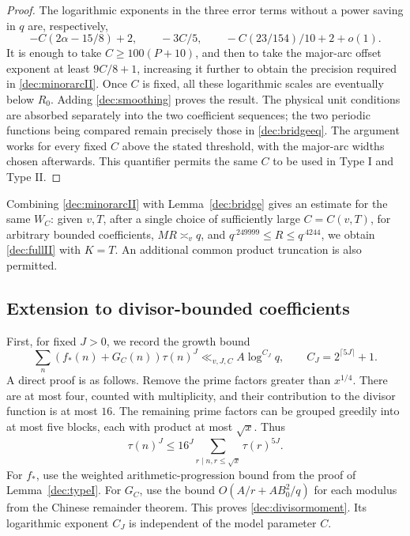 \documentclass[11pt,a4paper]{article}
\theoremstyle{paperplain}
\numberwithin{equation}{section}
\begin{document}
\begin{proof}
The logarithmic exponents in the three error terms without a power
saving in $q$ are, respectively,
\[
 -C(2\alpha-15/8)+2,\qquad -3C/5,\qquad
 -C(23/154)/10+2+o(1).
\]
It is enough to take $C\ge100(P+10)$, and then to take the
major-arc offset exponent at least $9C/8+1$, increasing it further
to obtain the precision required in \eqref{dec:minorarcII}.
Once $C$ is fixed, all these logarithmic scales are eventually below
$R_0$. Adding \eqref{dec:smoothing} proves the result.
The physical unit conditions are absorbed separately into the two
coefficient sequences; the two periodic functions being compared
remain precisely those in \eqref{dec:bridgeeq}.
The argument works for every fixed $C$ above the stated threshold,
with the major-arc widths chosen afterwards. This quantifier permits
the same $C$ to be used in Type I and Type II.
\end{proof}

Combining \eqref{dec:minorarcII} with Lemma~\ref{dec:bridge} gives
an estimate for the same $W_C$:
given $v,T$, after a single choice of sufficiently large $C=C(v,T)$,
for arbitrary bounded coefficients, $MR\asymp_vq$, and
$q^{.249999}\le R\le q^{.4244}$, we obtain \eqref{dec:fullII}
with $K=T$.
An additional common product truncation is also permitted.

\subsection{Extension to divisor-bounded coefficients}

First, for fixed $J>0$, we record the growth bound
\begin{equation}\label{dec:divisormoment}
 \sum_n(f_*(n)+G_C(n))\tau(n)^J
 \ll_{v,J,C}A\log^{C_J}q,\qquad C_J=2^{\lceil5J\rceil}+1.
\end{equation}
A direct proof is as follows.
Remove the prime factors greater than $x^{1/4}$.
There are at most four, counted with multiplicity, and their
contribution to the divisor function is at most $16$.
The remaining prime factors can be grouped greedily into at most five
blocks, each with product at most $\sqrt x$. Thus
\[
 \tau(n)^J\le16^J\sum_{r\mid n, r\le\sqrt x}\tau(r)^{5J}.
\]
For $f_*$, use the weighted arithmetic-progression bound from the
proof of Lemma~\ref{dec:typeI}.
For $G_C$, use the bound $O(A/r+AB_0^2/q)$ for each modulus
from the Chinese remainder theorem.
This proves \eqref{dec:divisormoment}.
Its logarithmic exponent $C_J$ is independent of the model parameter $C$.
\end{document}
